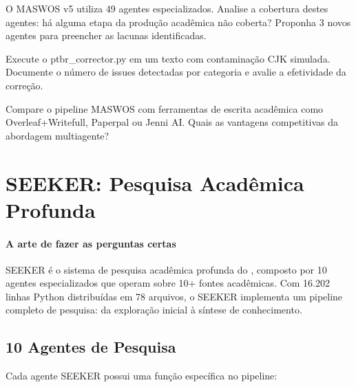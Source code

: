 \begin{exercicio}
O MASWOS v5 utiliza 49 agentes especializados. Analise a cobertura
destes agentes: há alguma etapa da produção acadêmica não coberta?
Proponha 3 novos agentes para preencher as lacunas identificadas.
\end{exercicio}

\begin{exercicio}
Execute o ptbr\_corrector.py em um texto com contaminação CJK
simulada. Documente o número de issues detectadas por categoria
e avalie a efetividade da correção.
\end{exercicio}

\begin{exercicio}
Compare o pipeline MASWOS com ferramentas de escrita acadêmica como
Overleaf+Writefull, Paperpal ou Jenni AI. Quais as vantagens
competitivas da abordagem multiagente?
\end{exercicio}

\section{SEEKER: Pesquisa Acadêmica Profunda}
\label{sec:seeker}
\nivelavancado

\paragraph{A arte de fazer as perguntas certas} SEEKER é o sistema de pesquisa acadêmica profunda do \opencodeeco{},
composto por 10 agentes especializados que operam sobre 10+ fontes
acadêmicas. Com 16.202 linhas Python distribuídas em 78 arquivos,
o SEEKER implementa um pipeline completo de pesquisa: da exploração
inicial à síntese de conhecimento.

\subsection{10 Agentes de Pesquisa}

Cada agente SEEKER possui uma função específica no pipeline:

